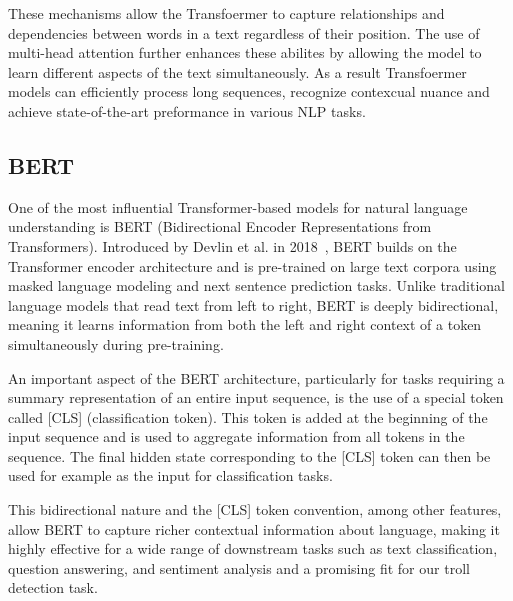 \documentclass[twoside]{ctuthesis}
\theoremstyle{plain}
\theoremstyle{definition}
\theoremstyle{note}
\begin{document}
These mechanisms allow the Transfoermer to capture relationships and dependencies between words in a text regardless of their position. The use of multi-head attention further enhances these abilites by allowing the model to learn different aspects of the text simultaneously. As a result Transfoermer models can efficiently process long sequences, recognize contexcual nuance and achieve state-of-the-art preformance in various NLP tasks.\par

\subsection{BERT}

One of the most influential Transformer-based models for natural language understanding is BERT (Bidirectional Encoder Representations from Transformers). Introduced by Devlin et al. in 2018~\cite{Devlin2018}, BERT builds on the Transformer encoder architecture and is pre-trained on large text corpora using masked language modeling and next sentence prediction tasks. Unlike traditional language models that read text from left to right, BERT is deeply bidirectional, meaning it learns information from both the left and right context of a token simultaneously during pre-training.\par

An important aspect of the BERT architecture, particularly for tasks requiring a summary representation of an entire input sequence, is the use of a special token called [CLS] (classification token). This token is added at the beginning of the input sequence and is used to aggregate information from all tokens in the sequence. The final hidden state corresponding to the [CLS] token can then be used for example as the input for classification tasks.\par

This bidirectional nature and the [CLS] token convention, among other features, allow BERT to capture richer contextual information about language, making it highly effective for a wide range of downstream tasks such as text classification, question answering, and sentiment analysis and a promising fit for our troll detection task.\par
\end{document}
